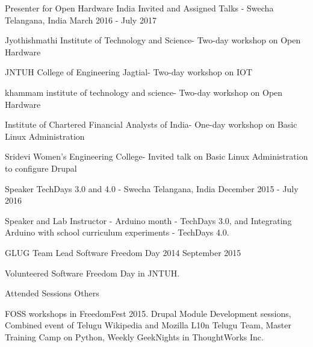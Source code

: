 \begin{cventries}
    \cventry
    {Presenter for Open Hardware India} %
    {Invited and Assigned Talks - Swecha} %
    {Telangana, India} %
    {March 2016 - July 2017} %
    {
      \begin{cvitems} %
        \item {Jyothishmathi Institute of Technology and Science- Two-day workshop on Open Hardware}
        \item {JNTUH College of Engineering Jagtial- Two-day workshop on IOT}
        \item {khammam institute of technology and science- Two-day workshop on Open Hardware}
        \item {Institute of Chartered Financial Analysts of India- One-day workshop on Basic Linux Administration}
        \item {Sridevi Women's Engineering College- Invited talk on Basic Linux Administration to configure Drupal}
      \end{cvitems}
    }
    \cventry
    {Speaker}
    {TechDays 3.0 and 4.0 - Swecha}
    {Telangana, India}
    {December 2015 - July 2016}
    {
        \begin{cvitems}
            \item {Speaker and Lab Instructor - Arduino month - TechDays 3.0, and Integrating Arduino with school curriculum experiments - TechDays 4.0.}
        \end{cvitems}
    }
    \cventry
    {GLUG Team Lead}
    {Software Freedom Day 2014}
    {}
    {September 2015}
    {
        \begin{cvitems}
            \item {Volunteered Software Freedom Day in JNTUH.}
        \end{cvitems}
    }
    \cventry
    {Attended Sessions}
    {Others}
    {}
    {}
    {
        \begin{cvitems}
            \item {FOSS workshops in FreedomFest 2015. Drupal Module Development sessions, Combined event of Telugu Wikipedia and Mozilla L10n Telugu Team, Master Training Camp on Python, Weekly GeekNights in ThoughtWorks Inc.}
        \end{cvitems}
    }
    
    
\end{cventries}
